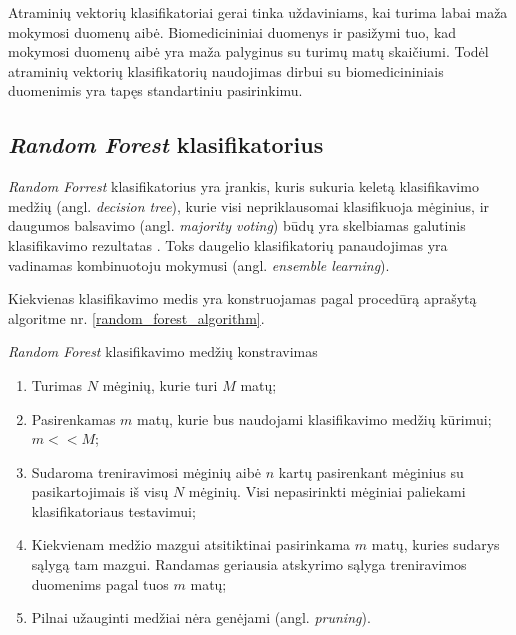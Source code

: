 Atraminių vektorių klasifikatoriai gerai tinka uždaviniams, kai turima labai maža mokymosi duomenų aibė. Biomedicininiai duomenys ir pasižymi tuo, kad mokymosi duomenų aibė yra maža palyginus su turimų matų skaičiumi. Todėl atraminių vektorių klasifikatorių naudojimas dirbui su biomedicininiais duomenimis yra tapęs standartiniu pasirinkimu. 




\subsection{\textit{Random Forest} klasifikatorius}

\textit{Random Forrest} klasifikatorius yra įrankis, kuris sukuria keletą klasifikavimo medžių (angl. \textit{decision tree}), kurie visi nepriklausomai klasifikuoja mėginius, ir daugumos balsavimo (angl. \textit{majority voting}) būdų yra skelbiamas galutinis klasifikavimo rezultatas \cite{breiman1984classification}. Toks daugelio klasifikatorių panaudojimas yra vadinamas kombinuotoju mokymusi (angl. \textit{ensemble learning}). 

Kiekvienas klasifikavimo medis yra konstruojamas pagal procedūrą aprašytą algoritme nr. \ref{random_forest_algorithm}.

\begin{algorithm}
 \caption{\textit{Random Forest} klasifikavimo medžių konstravimas}
 \label{random_forest_algorithm}
 \begin{enumerate}
  \item Turimas $N$ mėginių, kurie turi $M$ matų;
  \item Pasirenkamas $m$ matų, kurie bus naudojami klasifikavimo medžių kūrimui; $m << M$;
  \item Sudaroma treniravimosi mėginių aibė $n$ kartų pasirenkant mėginius su pasikartojimais iš visų $N$ mėginių. Visi nepasirinkti mėginiai paliekami klasifikatoriaus testavimui; 
  \item Kiekvienam medžio mazgui atsitiktinai pasirinkama $m$ matų, kuries sudarys sąlygą tam mazgui. Randamas geriausia atskyrimo sąlyga treniravimos duomenims pagal tuos $m$ matų;
  \item Pilnai užauginti medžiai nėra genėjami (angl. \textit{pruning}).
 \end{enumerate}
\end{algorithm}


